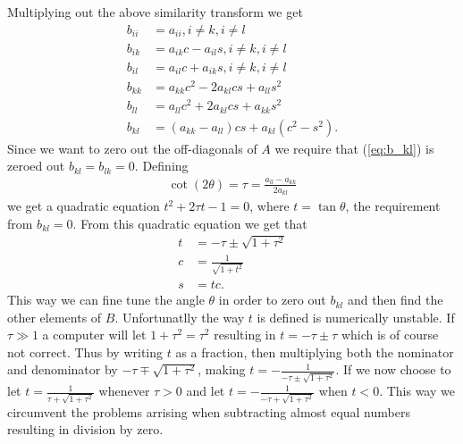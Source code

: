 \documentclass[twocolumn]{aastex62}
\begin{document}
Multiplying out the above similarity transform we get
\begin{align}
	b_{ii} &= a_{ii} , i\neq k, i\neq l\\
	b_{ik} &= a_{ik}c - a_{il}s, i\neq k, i\neq l\\
	b_{il} &= a_{il}c + a_{ik}s, i\neq k, i\neq l\\
	b_{kk} &= a_{kk}c^2 - 2a_{kl}cs + a_{ll}s^2\\
	b_{ll} &= a_{ll}c^2 + 2a_{kl}cs + a_{kk}s^2\\
	b_{kl} &= (a_{kk} - a_{ll})cs + a_{kl}(c^2 - s^2).
	\label{eq:b_kl}
\end{align}
Since we want to zero out the off-diagonals of $A$ we require that (\ref{eq:b_kl}) is zeroed out $b_{kl} = b_{lk} = 0$. Defining
\begin{align}
	\cot(2\theta) = \tau = \frac{a_{ll} - a_{kk}}{2a_{kl}}
\end{align}
we get a quadratic equation $t^2 + 2\tau t - 1 = 0$, where $t = \tan \theta$, the requirement from $b_{kl} = 0$. From this quadratic equation we get that
\begin{align}
	t &= -\tau \pm \sqrt{1+\tau^2}\\
	c & = \frac{1}{\sqrt{1+t^2}}\\
	s &= tc.
\end{align}
This way we can fine tune the angle $\theta$ in order to zero out $b_{kl}$ and then find the other elements of $B$.  Unfortunatlly the way $t$ is defined is numerically unstable. If $\tau\gg1$ a computer will let $1+\tau^2 = \tau^2$ resulting in $t = -\tau \pm \tau$ which is of course not correct. Thus by writing $t$ as a fraction, then multiplying both the nominator and denominator by $-\tau\mp\sqrt{1+\tau^2}$, making $t = -\frac{1}{-\tau \pm \sqrt{1 + \tau^2}}$. If we now choose to let $t = \frac{1}{\tau + \sqrt{1 + \tau^2}}$ whenever $\tau>0$ and let $t = -\frac{1}{-\tau + \sqrt{1+\tau^2}}$ when $t<0$. This way we circumvent the problems arrising when subtracting almost equal numbers resulting in division by zero.
\end{document}
